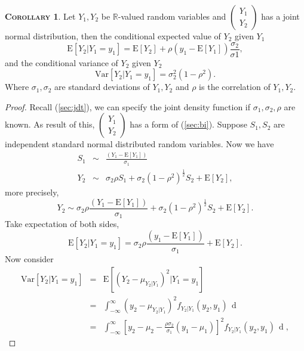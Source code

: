 \documentclass[a4paper, twoside, 11pt]{article}
\theoremstyle{definition}
\newtheorem{corollary}[definition]{\scshape Corollary}
\newcommand{\sqbr}[1]{\left[ {#1} \right]}
\begin{document}
\begin{corollary}
  Let $Y_1, Y_2$ be $\mathbb{R}$-valued random variables and $\left(
    \begin{array}{c}
      Y_1 \\
      Y_2
    \end{array}
	\right)$  has a joint normal distribution, then the conditional expected value of $Y_2$ given $Y_1$
    $$
	\mathrm{E}[Y_2| Y_1=y_1] = \mathrm{E}[Y_2] + \rho (y_1 - \mathrm{E}[Y_1])\frac{\sigma_2}{\sigma1},
	$$
	and the conditional variance of $Y_2$ given $Y_2$
	$$
		\mathrm{Var}[Y_2| Y_1 = y_1] = \sigma_2^2 (1 - \rho^2).
	$$
	Where $\sigma_1, \sigma_2$ are standard deviations of $Y_1, Y_2$ and $\rho$ is the correlation of $Y_1, Y_2$.
	\label{sec:condi}
\end{corollary}

\begin{proof}
  Recall (\ref{sec:jdt}), we can specify the joint density function if $\sigma_1, \sigma_2, \rho$ are known. As result of this,
  $\left(
    \begin{array}{c}
      Y_1 \\
      Y_2
    \end{array}
	\right)$ has a form of (\ref{sec:bi}).
  Suppose $S_1, S_2$ are independent standard normal distributed random variables. Now we have
  \begin{eqnarray*}
	S_1 &\sim& \frac{(Y_1 - \mathrm{E}[Y_1])}{\sigma_1} \\
	Y_2 &\sim& \sigma_2\rho S_1 + \sigma_2(1-\rho^2)^{\frac{1}{2}} S_2 + \mathrm{E}[Y_2],
  \end{eqnarray*}
  more precisely,
  $$
  Y_2 \sim \sigma_2\rho \frac{(Y_1 - \mathrm{E}[Y_1])}{\sigma_1}  + \sigma_2(1-\rho^2)^{\frac{1}{2}} S_2 + \mathrm{E}[Y_2].
  $$
  Take expectation of both sides, 
  \begin{equation*}
	\mathrm{E}[Y_2|Y_1=y_1] = \sigma_2\rho \frac{(y_1 - \mathrm{E}[Y_1])}{\sigma_1} + \mathrm{E}[Y_2].
  \end{equation*}
  Now consider
  \begin{eqnarray*}
	\mathrm{Var}[Y_2|Y_1=y_1] &=&  \mathrm{E}[(Y_2 - \mu_{Y_2|Y_1})^2|Y_1=y_1]\\
							  &=& \int_{-\infty}^{\infty}(y_2 - \mu_{Y_2|Y_1})^2f_{Y_2|Y_1}(y_2, y_1)\,\mathop{dy_2}\\
							  &=& \int_{-\infty}^{\infty}\sqbr{y_2 - \mu_2 - \frac{\rho\sigma_2}{\sigma_1}(y_1-\mu_1)}^2f_{Y_2|Y_1}(y_2, y_1)\,\mathop{dy_2},
  \end{eqnarray*}

\end{proof}
\end{document}

